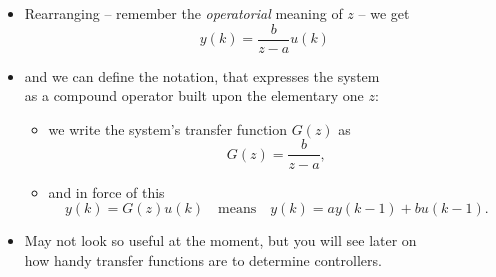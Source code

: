 \begin{frame}
\myPause
 \begin{itemize}[<+-| alert@+>]
 \item Rearranging -- remember the \emph{operatorial} meaning of $z$ -- we get
       \begin{displaymath}
        y(k) = \frac{b}{z-a}u(k)
       \end{displaymath}
\item[] and we can define the  notation, that expresses the system\\
        as a compound operator built upon the elementary one $z$:
       \begin{itemize}[<+-| alert@+>]
       \item we write the system's transfer function $G(z)$ as
             \begin{displaymath}
               G(z) = \frac{b}{z-a},
             \end{displaymath}
       \item[] and in force of this
             \begin{displaymath}
              y(k) = G(z)u(k) \quad \text{means} \quad y(k) = ay(k-1)+bu(k-1).
             \end{displaymath}
       \end{itemize}
 \item \vfill May not look so useful at the moment, but you will see later on\\
       how handy transfer functions are to determine controllers.
 \end{itemize}
\end{frame}


